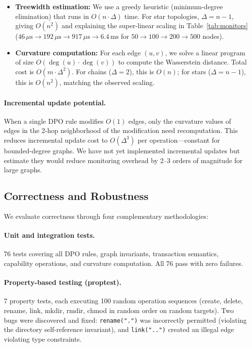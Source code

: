 \documentclass[11pt,a4paper]{article}
\theoremstyle{definition}
\theoremstyle{remark}
\begin{document}
\begin{itemize}[leftmargin=1.4em]
\item \textbf{Treewidth estimation:} We use a greedy heuristic
  (minimum-degree elimination) that runs in $O(n \cdot \Delta)$ time.
  For star topologies, $\Delta = n - 1$, giving $O(n^2)$ and
  explaining the super-linear scaling in Table~\ref{tab:monitors}
  ($46\,\mu\text{s} \to 192\,\mu\text{s} \to 917\,\mu\text{s}
  \to 6.4\,\text{ms}$ for $50 \to 100 \to 200 \to 500$ nodes).

\item \textbf{Curvature computation:} For each edge $(u, v)$, we
  solve a linear program of size $O(\deg(u) \cdot \deg(v))$ to
  compute the Wasserstein distance. Total cost is
  $O(m \cdot \Delta^2)$. For chains ($\Delta = 2$), this is $O(n)$;
  for stars ($\Delta = n - 1$), this is $O(n^2)$, matching the
  observed scaling.
\end{itemize}

\paragraph{Incremental update potential.}
When a single DPO rule modifies $O(1)$ edges, only the curvature
values of edges in the 2-hop neighborhood of the modification need
recomputation. This reduces incremental update cost to
$O(\Delta^3)$ per operation---constant for bounded-degree graphs.
We have not yet implemented incremental updates but estimate they
would reduce monitoring overhead by 2--3 orders of magnitude for
large graphs.

\subsection{Correctness and Robustness}
\label{sec:eval-correctness}

We evaluate correctness through four complementary methodologies:

\paragraph{Unit and integration tests.}
76 tests covering all DPO rules, graph invariants, transaction
semantics, capability operations, and curvature computation.
All 76 pass with zero failures.

\paragraph{Property-based testing (proptest).}
7 property tests, each executing 100 random operation sequences
(create, delete, rename, link, mkdir, rmdir, chmod in random order
on random targets). Two bugs were discovered and fixed:
\texttt{rename(".")} was incorrectly permitted (violating the
directory self-reference invariant), and \texttt{link("..")} created
an illegal edge violating type constraints.
\end{document}
